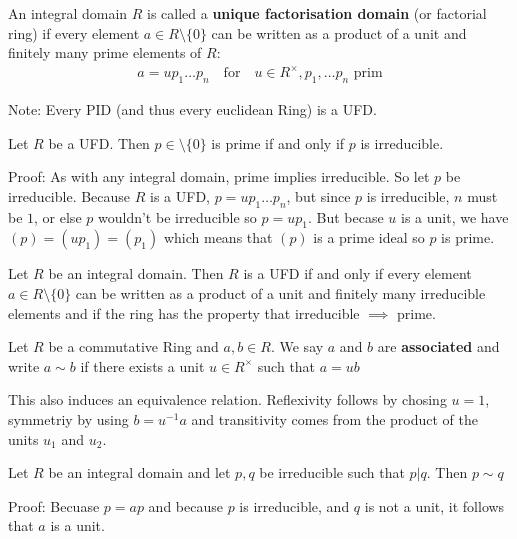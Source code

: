 \begin{definition}[UFD]
	An integral domain $R$ is called a \textbf{unique factorisation domain} (or factorial ring) if every element $a \in R \setminus \{0\}$ can be written as a product of a unit and finitely many prime elements of $R$:
	\begin{align*}
		a = up_1 \dots p_n \quad \text{for} \quad u \in R^{\times}, p_1, \ldots p_n \text{ prim}
	\end{align*}
\end{definition}
Note: Every PID (and thus every euclidean Ring) is a UFD.
\begin{proposition}[]
	Let $R$ be a UFD. Then $p \in \setminus \{0\}$ is prime if and only if $p$ is irreducible.
\end{proposition}
Proof: As with any integral domain, prime implies irreducible. So let $p$ be irreducible. Because $R$ is a UFD, $p = u p_1 \dots p_n$, but since $p$ is irreducible, $n$ must be $1$, or else $p$ wouldn't be irreducible so $p = u p_1$. But becase $u$ is a unit, we have $(p) = (up_1) = (p_1)$ which means that $(p)$ is a prime ideal so $p$ is prime.\\


\begin{corollary}[]
	Let $R$ be an integral domain. Then $R$ is a UFD if and only if every element $a \in R \setminus \{0\}$ can be written as a product of a unit and finitely many irreducible elements and if the ring has the property that irreducible $\implies$ prime.
\end{corollary}

\begin{definition}[]
	Let $R$ be a commutative Ring and $a,b \in R$. We say $a$ and $b$ are \textbf{associated} and write $a \sim b$ if there exists a unit $u \in R^{\times}$ such that $a = ub$
\end{definition}

This also induces an equivalence relation. Reflexivity follows by chosing $u = 1$, symmetriy by using $b = u^{-1}a$ and transitivity comes from the product of the units $u_1$ and $u_2$.\\


\begin{lemma}[]
	Let $R$ be an integral domain and let $p,q$ be irreducible such that $p | q$. Then $p \sim q$
\end{lemma}
Proof: Becuase $p = ap$ and because $p$ is irreducible, and $q$ is not a unit, it follows that $a$ is a unit.\\

